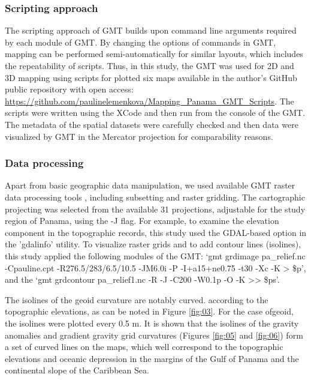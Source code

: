 \documentclass[USenglish,twocolumn]{article}
\begin{document}
\subsubsection{Scripting approach}

The scripting approach of GMT builds upon command line arguments required by each module of GMT. By changing the options of commands in GMT, mapping can be performed semi-automatically for similar layouts, which includes the repeatability of scripts. Thus, in this study, the GMT was used for 2D and 3D mapping \cite{Wessel} using scripts for plotted six maps available in the author's GitHub public repository with open access: \href{https://github.com/paulinelemenkova/Mapping_Panama_GMT_Scripts}{https://github.com/paulinelemenkova/Mapping\_Panama\_GMT\_Scripts}. The scripts were written using the XCode and then run from the console of the GMT. The metadata of the spatial datasets were carefully checked and then data were visualized by GMT in the Mercator projection for comparability reasons. 

\subsubsection{Data processing}

Apart from basic geographic data manipulation, we used available GMT raster data processing tools , including subsetting and raster gridding. The cartographic projecting was selected from the available 31 projections, adjustable for the study region of Panama, using the -J flag. For example, to examine the elevation component in the topographic records, this study used the GDAL-based option in the 'gdalinfo' utility. To visualize raster grids and to add contour lines (isolines), this study applied the following modules of the GMT: ‘gmt grdimage pa\_relief.nc -Cpauline.cpt -R276.5/283/6.5/10.5  -JM6.0i -P -I+a15+ne0.75 -t30 -Xc -K > \$p’, and the ‘gmt grdcontour pa\_relief1.nc -R -J -C200 -W0.1p -O -K >> \$ps’. 

The isolines of the geoid curvature are notably curved. according to the topographic elevations, as can be noted in Figure \ref{fig:03}. For the case ofgeoid, the isolines were plotted every 0.5 m. It is shown that the isolines of the gravity anomalies and gradient gravity grid curvatures (Figures \ref{fig:05} and \ref{fig:06}) form a set of curved lines on the maps, which well correspond to the topographic elevations and oceanic depression in the margins of the Gulf of Panama and the continental slope of the Caribbean Sea.  
\end{document}
